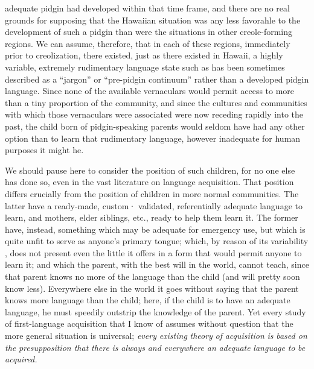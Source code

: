
adequate pidgin had developed within that time frame, and there are no real grounds for supposing that the Hawaiian situation was any less favorahle to the development of such a pidgin than were the situations in other creole-forming regions. We can assume, therefore, that in each of these regions, immediately prior to creolization, there existed, just as there existed in Hawaii, a highly variable, extremely rudimentary language state such as has been sometimes described as a ``jargon'' or ``pre-pidgin continuum'' rather than a developed pidgin language. Since none of the available vernaculars would permit access to more than a tiny proportion of the community, and since the cultures and communities with which those vernaculars were associated were now receding rapidly into the past, the child born of pidgin-speaking parents would seldom have had any other option than to learn that rudi\-mentary language, however inadequate for human purposes it might he.

We should pause here to consider the position of such children, for no one else has done so, even in the vast literature on language acquisition. That position differs crucially from the position of children in more normal communities. The latter have a ready-made, custom· validated, referentially adequate language to learn, and mothers, elder siblings, etc., ready to help them learn it. The former have, instead, something which may be adequate for emergency use, but which is quite unfit to serve as anyone's primary tongue; which, by reason of its variability , does not present even the little it offers in a form that would permit anyone to learn it; and which the parent, with the best will in the world, cannot teach, since that parent knows no more of the language than the child (and will pretty soon know less). Every\-where else in the world it goes without saying that the parent knows more language than the child; here, if the child is to have an adequate language, he must speedily outstrip the knowledge of the parent. Yet every study of first-language acquisition that I know of assumes without question that the more general situation is universal; \textit{every} \textit{existing} \textit{theory} \textit{of} \textit{acquisition }\textit{is} \textit{based on} \textit{the} \textit{presupposition that} \textit{there} \textit{is} \textit{always} \textit{and} \textit{everywhere} \textit{an} \textit{adequate} \textit{language} \textit{to} \textit{be acquired.}


